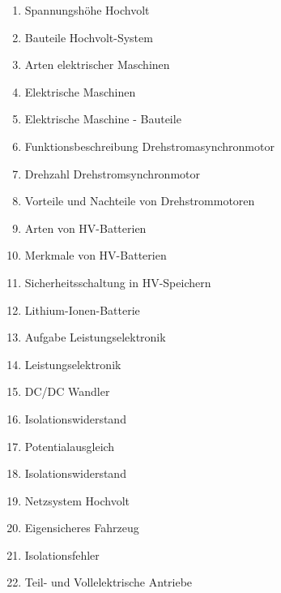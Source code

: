 \begin{enumerate}
\item
  Spannungshöhe Hochvolt\\
\item
  Bauteile Hochvolt-System\\
\item
  Arten elektrischer Maschinen\\
\item
  Elektrische Maschinen\\
\item
  Elektrische Maschine - Bauteile\\
\item
  Funktionsbeschreibung Drehstromasynchronmotor\\
\item
  Drehzahl Drehstromsynchronmotor\\
\item
  Vorteile und Nachteile von Drehstrommotoren\\
\item
  Arten von HV-Batterien\\
\item
  Merkmale von HV-Batterien\\
\item
  Sicherheitsschaltung in HV-Speichern\\
\item
  Lithium-Ionen-Batterie\\
\item
  Aufgabe Leistungselektronik\\
\item
  Leistungselektronik\\
\item
  DC/DC Wandler\\
\item
  Isolationswiderstand\\
\item
  Potentialausgleich\\
\item
  Isolationswiderstand\\
\item
  Netzsystem Hochvolt\\
\item
  Eigensicheres Fahrzeug\\
\item
  Isolationsfehler\\
\item
  Teil- und Vollelektrische Antriebe\\

\end{enumerate}
